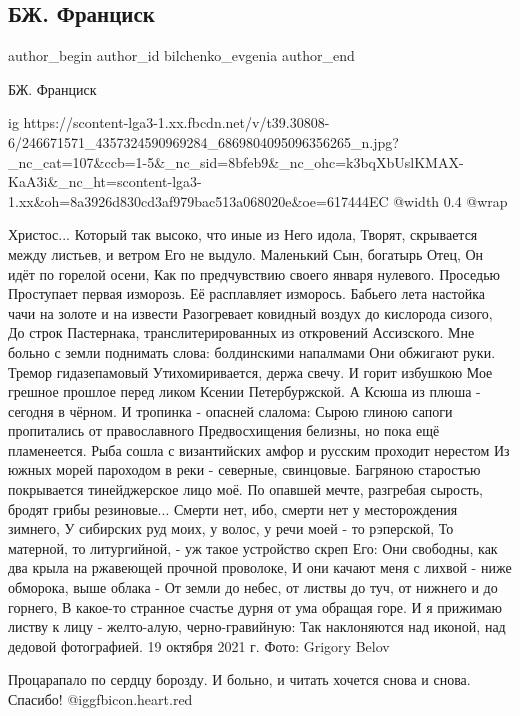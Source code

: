  
 
 
 
 
 
\subsection{БЖ. Франциск}
\label{sec:19_10_2021.fb.bilchenko_evgenia.5.francisk}
 
\ifcmt
 author_begin
   author_id bilchenko_evgenia
 author_end
\fi

БЖ. Франциск

\ifcmt
  ig https://scontent-lga3-1.xx.fbcdn.net/v/t39.30808-6/246671571_4357324590969284_6869804095096356265_n.jpg?_nc_cat=107&ccb=1-5&_nc_sid=8bfeb9&_nc_ohc=k3bqXbUslKMAX-KaA3i&_nc_ht=scontent-lga3-1.xx&oh=8a3926d830cd3af979bac513a068020e&oe=617444EC
  @width 0.4
  @wrap 
\fi

Христос... Который так высоко, что иные из Него идола,
Творят, скрывается между листьев, и ветром Его не выдуло.
Маленький Сын, богатырь Отец, Он идёт по горелой осени,
Как по предчувствию своего января нулевого. Проседью
Проступает первая изморозь. Её расплавляет изморось.
Бабьего лета настойка чачи на золоте и на извести
Разогревает ковидный воздух до кислорода сизого,
До строк Пастернака, транслитерированных из откровений Ассизского.
Мне больно с земли поднимать слова: болдинскими напалмами
Они обжигают руки. Тремор гидазепамовый
Утихомиривается, держа свечу. И горит избушкою
Мое грешное прошлое перед ликом Ксении Петербуржской.
А Ксюша из плюша - сегодня в чёрном. И тропинка - опасней слалома:
Сырою глиною сапоги пропитались от православного
Предвосхищения белизны, но пока ещё пламенеется.
Рыба сошла с византийских амфор и русским проходит нерестом
Из южных морей пароходом в реки - северные, свинцовые.
Багряною старостью покрывается тинейджерское лицо моё.
По опавшей мечте, разгребая сырость, бродят грибы резиновые...
Смерти нет, ибо, смерти нет у месторождения зимнего,
У сибирских руд моих, у волос, у речи моей - то рэперской,
То матерной, то литургийной, - уж такое устройство скреп Его:
Они свободны, как два крыла на ржавеющей прочной проволоке,
И они качают меня с лихвой - ниже обморока, выше облака -
От земли до небес, от листвы до туч, от нижнего и до горнего,
В какое-то странное счастье дурня от ума обращая горе.
И я прижимаю листву к лицу - желто-алую, черно-гравийную:
Так наклоняются над иконой, над дедовой фотографией.
19 октября 2021 г.
Фото: Grigory Belov

\begin{itemize} %
Процарапало по сердцу борозду. И больно, и читать хочется снова и снова. Спасибо! @igg{fbicon.heart.red}
\end{itemize} %
